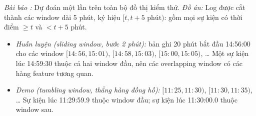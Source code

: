 \textit{Bài báo \cite{aly2025ocrapt}:} Dự đoán một lần trên toàn bộ đồ thị kiểm thử. \textit{Đồ án:} Log được cắt thành các window dài 5 phút, ký hiệu $[t, t + 5\text{ phút})$: gồm mọi sự kiện có thời điểm $\ge t$ và $< t + 5$ phút.
\begin{itemize}
    \item \emph{Huấn luyện (sliding window, bước 2 phút):} bản ghi 20 phút bắt đầu 14:56:00 cho các window $[14{:}56, 15{:}01)$, $[14{:}58, 15{:}03)$, $[15{:}00, 15{:}05)$, \ldots{} Một sự kiện lúc 14:59:30 thuộc cả hai window đầu, nên các overlapping window có các hàng feature tương quan.
    \item \emph{Demo (tumbling window, thẳng hàng đồng hồ):} $[11{:}25, 11{:}30)$, $[11{:}30, 11{:}35)$, \ldots{} Sự kiện lúc 11:29:59.9 thuộc window đầu; sự kiện lúc 11:30:00.0 thuộc window sau.
\end{itemize}
